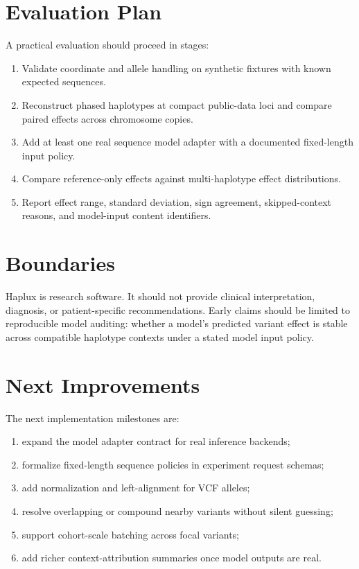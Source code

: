 \documentclass[11pt]{article}
\begin{document}
\section{Evaluation Plan}

A practical evaluation should proceed in stages:

\begin{enumerate}
  \item Validate coordinate and allele handling on synthetic fixtures with known
        expected sequences.
  \item Reconstruct phased haplotypes at compact public-data loci and compare
        paired effects across chromosome copies.
  \item Add at least one real sequence model adapter with a documented
        fixed-length input policy.
  \item Compare reference-only effects against multi-haplotype effect
        distributions.
  \item Report effect range, standard deviation, sign agreement, skipped-context
        reasons, and model-input content identifiers.
\end{enumerate}

\section{Boundaries}

Haplux is research software. It should not provide clinical interpretation,
diagnosis, or patient-specific recommendations. Early claims should be limited
to reproducible model auditing: whether a model's predicted variant effect is
stable across compatible haplotype contexts under a stated model input policy.

\section{Next Improvements}

The next implementation milestones are:

\begin{enumerate}
  \item expand the model adapter contract for real inference backends;
  \item formalize fixed-length sequence policies in experiment request schemas;
  \item add normalization and left-alignment for VCF alleles;
  \item resolve overlapping or compound nearby variants without silent guessing;
  \item support cohort-scale batching across focal variants;
  \item add richer context-attribution summaries once model outputs are real.
\end{enumerate}
\end{document}
